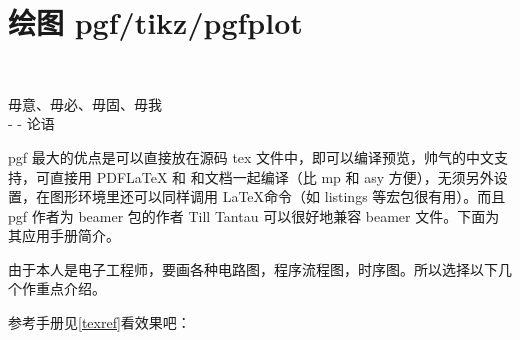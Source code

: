 \chapter{绘图  pgf/tikz/pgfplot}
\thispagestyle{fancy}
~\\[9cm]
\begin{flushright}
\kai\xiaosi
\textcolor[rgb]{0.00,0.50,0.00}{
毋意、毋必、毋固、毋我\\
- - 论语}
\end{flushright}
\clearpage
pgf 最大的优点是可以直接放在源码 tex 文件中，即可以编译预览，帅气的中文支持，可直接用 PDFLaTeX 和 \XeLaTeX 和文档一起编译（比 mp 和 asy 方便），无须另外设置，在图形环境里还可以同样调用 \LaTeX 命令（如 listings 等宏包很有用）。而且 pgf 作者为 beamer 包的作者 Till Tantau 可以很好地兼容 beamer 文件。下面为其应用手册简介。

由于本人是电子工程师，要画各种电路图，程序流程图，时序图。所以选择以下几个作重点介绍。

参考手册见\ref{texref}看效果吧：\\~\\


